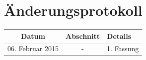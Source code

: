 \documentclass[a4paper,titlepage]{scrartcl}
\numberwithin{equation}{section}
\begin{document}
\section{Änderungsprotokoll}
\begin{table}[H]
\centering
\begin{tabularx}{\textwidth}{| c | c | X |}
\hline
\textbf{Datum} & \textbf{Abschnitt} & \textbf{Details}\\
\hline
06. Februar 2015 & - & 1. Fassung\\
\hline
\end{tabularx}
\end{table}


\end{document}
